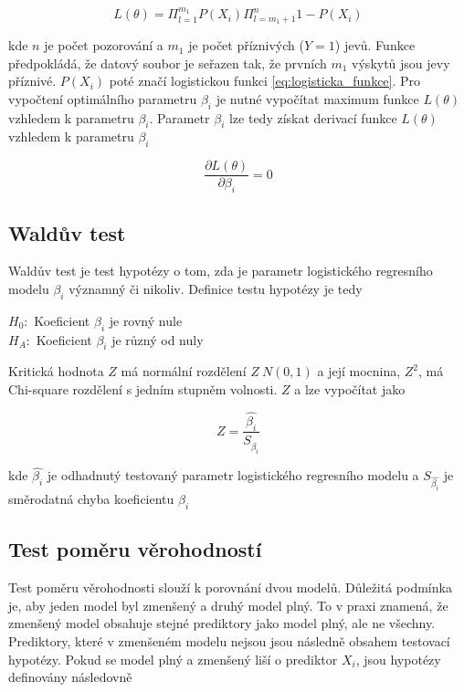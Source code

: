 \begin{equation}
    \label{eq:pravdepodobnostni_fce}
    L(\theta) = \Pi_{l = 1}^{m_1} P(X_i) \Pi_{l = m_1 + 1}^{n} 1 - P(X_i) 
\end{equation}

kde $n$ je počet pozorování a $m_1$ je počet příznivých ($Y = 1$) jevů. Funkce předpokládá, že datový soubor je seřazen tak, že prvních $m_1$ výskytů
jsou jevy příznivé. $P(X_i)$ poté značí logistickou funkci \ref{eq:logisticka_funkce}. Pro vypočtení optimálního parametru $\beta_i$ je nutné vypočítat
maximum funkce $L(\theta)$ vzhledem k parametru $\beta_i$. Parametr $\beta_i$ lze tedy získat derivací funkce $L(\theta)$ vzhledem k parametru $\beta_i$

\begin{equation}
    \frac{\partial L(\theta)}{\partial \beta_i} = 0
\end{equation}

\subsection{Waldův test}
Waldův test je test hypotézy o tom, zda je parametr logistického regresního modelu $\beta_i$ významný či nikoliv. Definice
testu hypotézy je tedy

$H_0:$ Koeficient $\beta_i$ je rovný nule \\
$H_A:$ Koeficient $\beta_i$ je různý od nuly

Kritická hodnota $Z$ má normální rozdělení $Z ~ N(0, 1)$ a její mocnina, $Z^2$, má Chi-square rozdělení s jedním stupněm volnosti.
$Z$ a lze vypočítat jako

\begin{equation}
    Z = \frac{\hat{\beta_i}}{S_{\hat{\beta_i}}}
\end{equation}

kde $\hat{\beta_i}$ je odhadnutý testovaný parametr logistického regresního modelu a $S_{\hat{\beta_i}}$ je směrodatná chyba koeficientu $\beta_i$

\subsection{Test poměru věrohodností}
Test poměru věrohodnosti slouží k porovnání dvou modelů. Důležitá podmínka je, aby jeden model byl zmenšený a druhý model plný.
To v praxi znamená, že zmenšený model obsahuje stejné prediktory jako model plný, ale ne všechny. Prediktory, které v zmenšeném modelu
nejsou jsou následně obsahem testovací hypotézy. Pokud se model plný a zmenšený liší o prediktor $X_i$, jsou hypotézy definovány následovně

